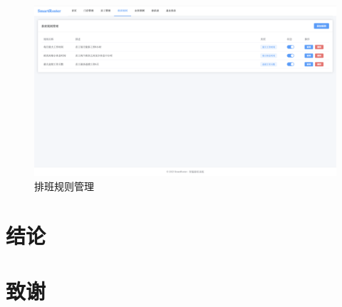 \documentclass{ctexart}
\begin{document}
\begin{figure}[H]
    \centering
    \includegraphics[width=0.8\linewidth]{./source/排班规则管理.png}
    \caption{排班规则管理}
\end{figure}


\section{结论}


\section*{致谢}



\end{document}
